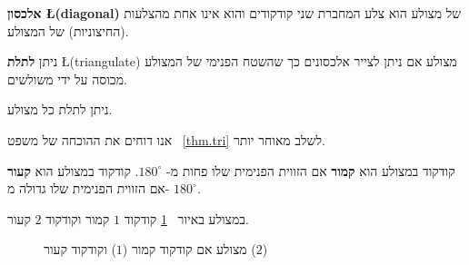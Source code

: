 \begin{definition}
\textbf{אלכסון \L{(diagonal)}}
של מצולע הוא צלע המחברת שני קודקודים והוא אינו אחת מהצלעות (החיצוניות) של המצולע.
\end{definition}
\begin{definition}
ניתן 
\textbf{לתלת}
\L{(triangulate)}
מצולע אם ניתן לצייר אלכסונים כך שהשטח הפנימי של המצולע מכוסה על ידי משולשים.
\end{definition}
\begin{theorem}\label{thm.tri}
ניתן לתלת כל מצולע.
\end{theorem}
אנו דוחים את ההוכחה של משפט%
~\ref{thm.tri}
לשלב מאוחר יותר.
\begin{definition}
קודקוד במצולע הוא 
\textbf{קמור}
אם הזווית הפנימית שלו פחות מ-%
$180^\circ$.
קודקוד במצולע הוא
\textbf{קעור}
אם הזווית הפנימית שלו גדולה מ-%
$180^\circ$.

במצולע באיור%
~\ref{f.museum.arbitrary}
קודקוד 
$1$
קמור וקודקוד
$2$
קעור.
\end{definition}
\begin{figure}[tb]
\begin{center}
\end{center}
\caption{מצולע אם קודקוד קמור
($1$)
וקודקוד קעור
($2$)}\label{f.museum.arbitrary}
\end{figure}

